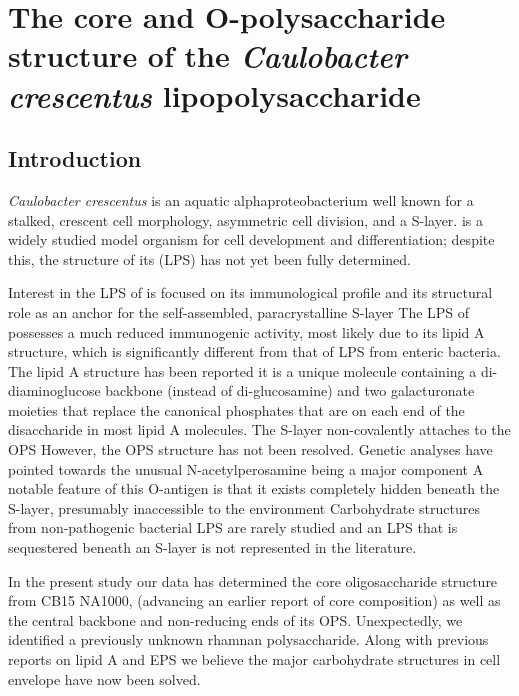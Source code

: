 \acresetall

\chapter{The core and O-polysaccharide structure of the \textit{Caulobacter crescentus} lipopolysaccharide}
\label{ch:lps}

\section{Introduction} %
\label{sec:introduction} 
	\textit{Caulobacter crescentus} is an aquatic alphaproteobacterium well known for a stalked, crescent cell morphology, asymmetric cell division, and a \ac{S-layer}. \caulobacter is a widely studied model organism for cell development and differentiation; despite this, the structure of its (\ac{LPS}) has not yet been fully determined.

	Interest in the \ac{LPS} of \caulobacter is focused on its immunological profile and its structural role as an anchor for the self-assembled, paracrystalline \ac{S-layer} The \ac{LPS} of \caulobacter possesses a much reduced immunogenic activity, most likely due to its lipid A structure, which is significantly different from that of \ac{LPS} from enteric bacteria. The lipid A structure has been reported it is a unique molecule containing a di-diaminoglucose backbone (instead of di-glucosamine) and two galacturonate moieties that replace the canonical phosphates that are on each end of the disaccharide in most lipid A molecules. The \caulobacter \ac{S-layer} non-covalently attaches to the \ac{OPS} However, the \ac{OPS} structure has not been resolved. Genetic analyses have pointed towards the unusual N-acetylperosamine being a major component A notable feature of this O-antigen is that it exists completely hidden beneath the S-layer, presumably inaccessible to the environment Carbohydrate structures from non-pathogenic bacterial \ac{LPS} are rarely studied and an \ac{LPS} that is sequestered beneath an \ac{S-layer} is not represented in the literature.

	In the present study our data has determined the core oligosaccharide structure from \caulobacter CB15 NA1000, (advancing an earlier report of core composition) as well as the central backbone and non-reducing ends of its OPS. Unexpectedly, we identified a previously unknown rhamnan polysaccharide. Along with previous reports on lipid A and \ac{EPS} we believe the major carbohydrate structures in \caulobacter cell envelope have now been solved.

